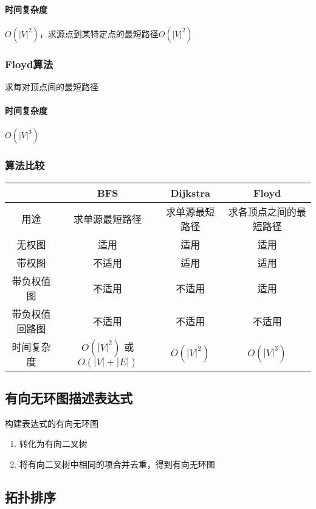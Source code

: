 \paragraph{时间复杂度}
\(O(|V|^2)\)，求源点到某特定点的最短路径\(O(|V|^2)\)

\subsubsection{Floyd算法}
求每对顶点间的最短路径

\paragraph{时间复杂度}
\(O(|V|^3)\)

\subsubsection{算法比较}
\begin{center}
    \begin{tabular}{c | c | c | c}
         & BFS & Dijkstra & Floyd \\
        \hline
        用途 & 求单源最短路径 & 求单源最短路径 & 求各顶点之间的最短路径 \\ 
        \hline
        无权图 & 适用 & 适用 & 适用 \\ 
        \hline
        带权图 & 不适用 & 适用 & 适用 \\ 
        \hline
        带负权值图 & 不适用 & 不适用 & 适用 \\ 
        \hline
        带负权值回路图 & 不适用 & 不适用 & 不适用 \\ 
        \hline
        时间复杂度 & \(O(|V|^2)\) 或\(O(|V| + |E|)\) & \(O(|V|^2)\) & \(O(|V|^3)\)
    \end{tabular}
\end{center}

\subsection{有向无环图描述表达式}
构建表达式的有向无环图
\begin{enumerate}
    \item 转化为有向二叉树
    \item 将有向二叉树中相同的项合并去重，得到有向无环图
\end{enumerate}


\subsection{拓扑排序}
